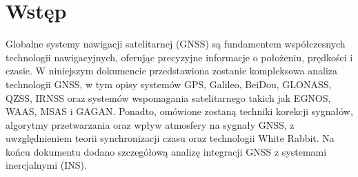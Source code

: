 \section{Wstęp}
Globalne systemy nawigacji satelitarnej (GNSS) są fundamentem współczesnych technologii nawigacyjnych, oferując precyzyjne informacje o położeniu, prędkości i czasie. W niniejszym dokumencie przedstawiona zostanie kompleksowa analiza technologii GNSS, w tym opisy systemów GPS, Galileo, BeiDou, GLONASS, QZSS, IRNSS oraz systemów wspomagania satelitarnego takich jak EGNOS, WAAS, MSAS i GAGAN. Ponadto, omówione zostaną techniki korekcji sygnałów, algorytmy przetwarzania oraz wpływ atmosfery na sygnały GNSS, z uwzględnieniem teorii synchronizacji czasu oraz technologii White Rabbit. Na końcu dokumentu dodano szczegółową analizę integracji GNSS z systemami inercjalnymi (INS).
